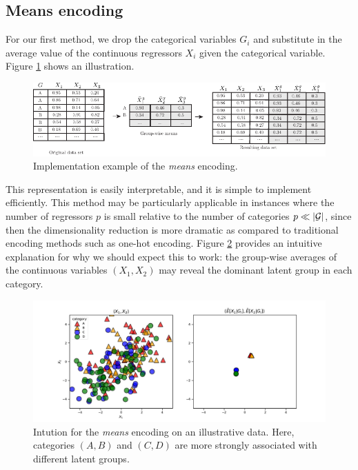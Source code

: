 \documentclass{article}
\theoremstyle{plain}
\theoremstyle{definition}
\theoremstyle{remark}
\begin{document}
\subsection{Means encoding}
\label{subsec:means}

For our first method, we drop the categorical variables $G_{i}$ and substitute in the average value of the continuous regressors $X_{i}$ given the categorical variable. Figure \ref{fig:means_encoding} shows an illustration.


\begin{figure}[H]
  \centering
  \includegraphics[width=\textwidth]{figures/means_encoding.pdf}
  \caption{Implementation example of the \emph{means} encoding.}
  \label{fig:means_encoding}
\end{figure}

This representation is easily interpretable, and it is simple to implement efficiently. This method may be particularly applicable in instances where the number of regressors $p$ is small relative to the number of categories $p \ll |\mathcal{G}|$, since then the dimensionality reduction is more dramatic as compared to traditional encoding methods such as one-hot encoding.
Figure \ref{fig:means_intuition} provides an intuitive explanation for why we should expect this to work: the group-wise averages of the continuous variables $(X_{1}, {X_{2}})$ may reveal the dominant latent group in each category.

\begin{figure}[H]
  \centering
  \includegraphics[width=\textwidth]{figures/means_intuition.pdf}
  \caption{Intution for the \emph{means} encoding on an illustrative data. Here, categories $(A,B)$ and $(C,D)$ are more strongly associated with different latent groups.}
  \label{fig:means_intuition}
\end{figure}
\end{document}
